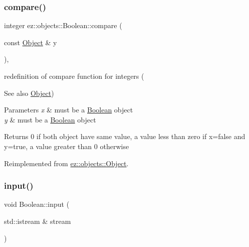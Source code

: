 \subsubsection{\texorpdfstring{compare()}{compare()}}
{\footnotesize\ttfamily integer ez\+::objects\+::\+Boolean\+::compare (\begin{DoxyParamCaption}\item[{const \hyperlink{classez_1_1objects_1_1Object}{Object} \&}]{y }\end{DoxyParamCaption})\hspace{0.3cm}{\ttfamily [inline]}, {\ttfamily [virtual]}}

redefinition of compare function for integers (\begin{DoxySeeAlso}{See also}
\hyperlink{classez_1_1objects_1_1Object}{Object}) 
\end{DoxySeeAlso}

\begin{DoxyParams}{Parameters}
{\em x} & must be a \hyperlink{classez_1_1objects_1_1Boolean}{Boolean} object \\
\hline
{\em y} & must be a \hyperlink{classez_1_1objects_1_1Boolean}{Boolean} object \\
\hline
\end{DoxyParams}
\begin{DoxyReturn}{Returns}
0 if both object have same value, a value less than zero if x=false and y=true, a value greater than 0 otherwise 
\end{DoxyReturn}


Reimplemented from \hyperlink{classez_1_1objects_1_1Object_aca311d389dffa204e425463145f4e1e6}{ez\+::objects\+::\+Object}.

\mbox{\label{classez_1_1objects_1_1Boolean_a36f2ae3b2e092b0f6f1d4c0be108e9e3}} 
\subsubsection{\texorpdfstring{input()}{input()}}
{\footnotesize\ttfamily void Boolean\+::input (\begin{DoxyParamCaption}\item[{std\+::istream \&}]{stream }\end{DoxyParamCaption})\hspace{0.3cm}{\ttfamily [virtual]}}

